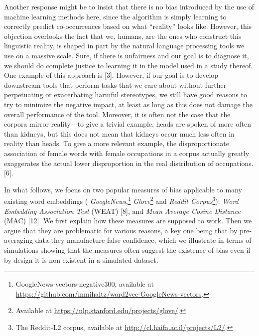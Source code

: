 \documentclass[
  12pt,
  dvipsnames,enabledeprecatedfontcommands]{scrartcl}
\begin{document}
Another response might be to insist that there is no bias introduced by
the use of machine learning methods here, since the algorithm is simply
learning to correctly predict co-occurrences based on what ``reality''
looks like. However, this objection overlooks the fact that we, humans,
are the ones who construct this linguistic reality, is shaped in part by
the natural language processing tools we use on a massive scale. Sure,
if there is unfairness and our goal is to diagnose it, we should do
complete justice to learning it in the model used in a study thereof.
One example of this approach is {[}3{]}. However, if our goal is to
develop downstream tools that perform tasks that we care about without
further perpetuating or exacerbating harmful stereotypes, we still have
good reasons to try to minimize the negative impact, at least as long as
this does not damage the overall performance of the tool. Moreover, it
is often not the case that the corpora mirror reality---to give a
trivial example, heads are spoken of more often than kidneys, but this
does not mean that kidneys occur much less often in reality than heads.
To give a more relevant example, the disproportionate association of
female words with female occupations in a corpus actually greatly
exaggerates the actual lower disproportion in the real distribution of
occupations. {[}6{]}.

In what follows, we focus on two popular measures of bias applicable to
many existing word embeddings (
\emph{GoogleNews},\footnote{GoogleNews-vectors-negative300, available at  \url{https://github.com/mmihaltz/word2vec-GoogleNews-vectors}.}
\emph{Glove}\footnote{Available at \url{https://nlp.stanford.edu/projects/glove/}.}
and
\emph{Reddit Corpus}\footnote{The Reddit-L2 corpus, available at  \url{http://cl.haifa.ac.il/projects/L2/}.}):
\emph{Word Embedding Association Test} (\textsf{WEAT}) {[}8{]}, and
\emph{Mean Average Cosine Distance} (\textsf{MAC}) {[}12{]}. We first
explain how these measures are supposed to work. Then we argue that they
are problematic for various reasons, a key one being that by
pre-averaging data they manufacture false confidence, which we
illustrate in terms of simulations showing that the measures often
suggest the existence of bias even if by design it is non-existent in a
simulated dataset.
\end{document}
